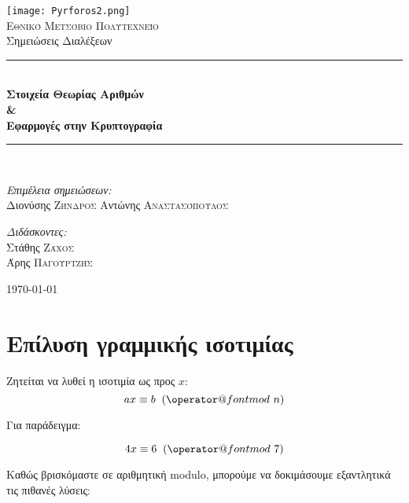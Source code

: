 \documentclass[11pt,a4paper]{book}
\makeatletter
\newcommand{\HRule}{\rule{\linewidth}{0.5mm}}
\def\imod#1{\allowbreak\mkern10mu({\operator@font mod}\,\,#1)}
\makeatother
\begin{document}
\begin{titlepage}
\begin{center}

\texttt{[image: Pyrforos2.png]}\\[1.cm]
\textsc{\LARGE Εθνικό Μετσόβιο Πολυτεχνείο}\\[1.5cm]

\Large{ Σημειώσεις Διαλέξεων }\\[0.5cm]

\begin{doublespace}
\HRule \\[0.4cm]
{\huge \bfseries
Στοιχεία Θεωρίας Αριθμών
\\
\&
\\
Εφαρμογές στην Κρυπτογραφία
}\\[0.4cm]
\end{doublespace}

\HRule \\[1.5cm]

\begin{minipage}{0.4\textwidth}
\begin{flushleft} \large
\emph{Επιμέλεια σημειώσεων:}\\
Διονύσης \textsc{Ζήνδρος}
Αντώνης \textsc{Αναστασόπουλος}
\end{flushleft}
\end{minipage}
\begin{minipage}{0.4\textwidth}
\begin{flushright} \large
\emph{Διδάσκοντες:} \\
Στάθης \textsc{Ζάχος}\\
Άρης \textsc{Παγουρτζής}
\end{flushright}
\end{minipage}

\vfill

{\large \today}
\end{center}
\end{titlepage}

\section*{Επίλυση γραμμικής ισοτιμίας}

Ζητείται να λυθεί η ισοτιμία ως προς $x$:
\[
ax \equiv b \imod n
\]

Για παράδειγμα:

\[
4x \equiv 6 \imod 7
\]

Καθώς βρισκόμαστε σε αριθμητική \textlatin{modulo}, μπορούμε να δοκιμάσουμε εξαντλητικά τις πιθανές λύσεις:
\end{document}
